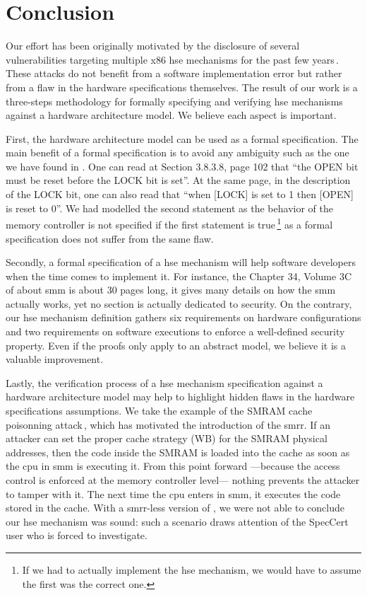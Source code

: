 \section{Conclusion}
\label{sec:speccert:discuss}

Our effort has been originally motivated by the disclosure of several
vulnerabilities targeting multiple x86 \ac{hse} mechanisms for the past few
years\,\cite{wojtczuk2009smram,duflot2009smram,rutkowska2008remap,domas2015sinkhole,kallenberg2015racecondition}.
%
These attacks do not benefit from a software implementation error but rather
from a flaw in the hardware specifications themselves.
%
The result of our work is a three-steps methodology for formally specifying and
verifying \ac{hse} mechanisms against a hardware architecture model.
%
We believe each aspect is important.

First, the hardware architecture model can be used as a formal specification.
%
The main benefit of a formal specification is to avoid any ambiguity such as the
one we have found in \cite{intel2009mch}.
%
One can read at Section 3.8.3.8, page 102 that ``the OPEN bit must be reset
before the LOCK bit is set''.
%
At the same page, in the description of the LOCK bit, one can also read that
``when [LOCK] is set to 1 then [OPEN] is reset to 0''.
%
We had modelled the second statement as the behavior of the memory controller is
not specified if the first statement is true\,\footnote{If we had to actually
  implement the \ac{hse} mechanism, we would have to assume the first was the
  correct one.}   as a formal specification does not suffer
from the same flaw.

Secondly, a formal specification of a \ac{hse} mechanism will help software
developers when the time comes to implement it.
%
For instance, the Chapter 34, Volume 3C of \cite{intel2014manual} about \ac{smm}
is about 30 pages long, it gives many details on how the \ac{smm} actually
works, yet no section is actually dedicated to security.
%
On the contrary, our \ac{hse} mechanism definition gathers six requirements on
hardware configurations and two requirements on software executions to enforce a
well-defined security property.
%
Even if the proofs only apply to an abstract model, we believe it is a valuable
improvement.

Lastly, the verification process of a \ac{hse} mechanism specification against a
hardware architecture model may help to highlight hidden flaws in the hardware
specifications assumptions.
%
We take the example of the SMRAM cache poisonning
attack\,\cite{wojtczuk2009smram,duflot2009smram}, which has motivated the
introduction of the \ac{smrr}.
%
If an attacker can set the proper cache strategy (WB) for the SMRAM physical
addresses, then the code inside the SMRAM is loaded into the cache as soon as
the \ac{cpu} in \ac{smm} is executing it.
%
From this point forward ---because the access control is enforced at the memory
controller level--- nothing prevents the attacker to tamper with it.
%
The next time the \ac{cpu} enters in \ac{smm}, it executes the code stored in
the cache. With a \ac{smrr}-less version of , we were not able
to conclude our \ac{hse} mechanism was sound: such a scenario draws attention of
the SpecCert user who is forced to investigate.

